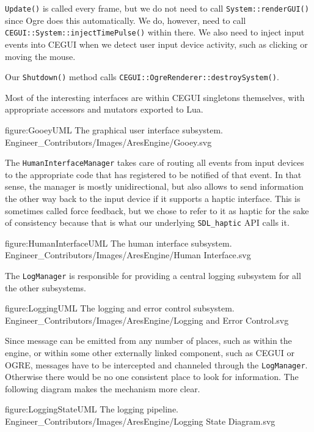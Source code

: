 {\tt Update()} is called every frame, but we do not need to call {\tt System::renderGUI()} since Ogre does this automatically. We do, however, need to call {\tt CEGUI::System::injectTimePulse()} within there. We also need to inject input events into CEGUI when we detect user input device activity, such as clicking or moving the mouse.

Our {\tt Shutdown()} method calls {\tt CEGUI::OgreRenderer::destroySystem()}.

Most of the interesting interfaces are within CEGUI singletons themselves, with appropriate accessors and mutators exported to Lua.

\FullPageDiagram
    {figure:GooeyUML}
    {The graphical user interface subsystem.}
    {Engineer_Contributors/Images/AresEngine/Gooey.svg}

\page 
{}
The {\tt HumanInterfaceManager} takes care of routing all events from input devices to the appropriate code that has registered to be notified of that event. In that sense, the manager is mostly unidirectional, but also allows to send information the other way back to the input device if it supports a haptic interface. This is sometimes called force feedback, but we chose to refer to it as haptic for the sake of consistency because that is what our underlying {\tt SDL_haptic} API calls it.

\FullPageDiagram
    {figure:HumanInterfaceUML}
    {The human interface subsystem.}
    {Engineer_Contributors/Images/AresEngine/Human Interface.svg}

\page 
{}
The {\tt LogManager} is responsible for providing a central logging subsystem for all the other subsystems.

\FullPageDiagram
    {figure:LoggingUML}
    {The logging and error control subsystem.}
    {Engineer_Contributors/Images/AresEngine/Logging and Error Control.svg}
    
Since message can be emitted from any number of places, such as within the engine, or within some other externally linked component, such as CEGUI or OGRE, messages have to be intercepted and channeled through the {\tt LogManager}. Otherwise there would be no one consistent place to look for information. The following diagram makes the mechanism more clear.

\FullPageDiagram
    {figure:LoggingStateUML}
    {The logging pipeline.}
    {Engineer_Contributors/Images/AresEngine/Logging State Diagram.svg}

